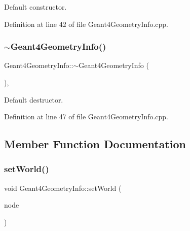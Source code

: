 Default constructor. 



Definition at line 42 of file Geant4\+Geometry\+Info.\+cpp.

\hypertarget{class_d_d4hep_1_1_simulation_1_1_geant4_geometry_info_ab6da85b84ee74c106b5d4713dc5ccaef}{}\label{class_d_d4hep_1_1_simulation_1_1_geant4_geometry_info_ab6da85b84ee74c106b5d4713dc5ccaef} 
\subsubsection{\texorpdfstring{$\sim$\+Geant4\+Geometry\+Info()}{~Geant4GeometryInfo()}}
{\footnotesize\ttfamily Geant4\+Geometry\+Info\+::$\sim$\+Geant4\+Geometry\+Info (\begin{DoxyParamCaption}{ }\end{DoxyParamCaption})\hspace{0.3cm}{\ttfamily [private]}, {\ttfamily [virtual]}}



Default destructor. 



Definition at line 47 of file Geant4\+Geometry\+Info.\+cpp.



\subsection{Member Function Documentation}
\hypertarget{class_d_d4hep_1_1_simulation_1_1_geant4_geometry_info_a9ccd539edd7ae098b69bcb3b035b8daf}{}\label{class_d_d4hep_1_1_simulation_1_1_geant4_geometry_info_a9ccd539edd7ae098b69bcb3b035b8daf} 
\subsubsection{\texorpdfstring{set\+World()}{setWorld()}}
{\footnotesize\ttfamily void Geant4\+Geometry\+Info\+::set\+World (\begin{DoxyParamCaption}\item[{const T\+Geo\+Node $\ast$}]{node }\end{DoxyParamCaption})}



